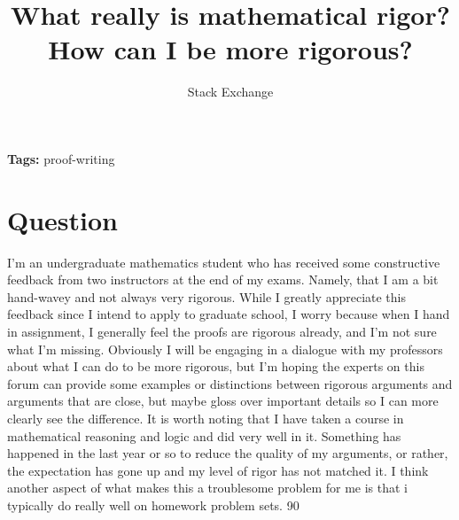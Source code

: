 \documentclass{article}
\title{What really is mathematical rigor? How can I be more rigorous?}
\author{Stack Exchange}
\date{}
\begin{document}
\maketitle

\noindent\textbf{Tags:} proof-writing

\section*{Question}
I'm an undergraduate mathematics student who has received some constructive feedback from two instructors at the end of my exams. Namely, that I am a bit hand-wavey and not always very rigorous. While I greatly appreciate this feedback since I intend to apply to graduate school, I worry because when I hand in assignment, I generally feel the proofs are rigorous already, and I'm not sure what I'm missing. Obviously I will be engaging in a dialogue with my professors about what I can do to be more rigorous, but I'm hoping the experts on this forum can provide some examples or distinctions between rigorous arguments and arguments that are close, but maybe gloss over important details so I can more clearly see the difference. It is worth noting that I have taken a course in mathematical reasoning and logic and did very well in it. Something has happened in the last year or so to reduce the quality of my arguments, or rather, the expectation has gone up and my level of rigor has not matched it. I think another aspect of what makes this a troublesome problem for me is that i typically do really well on homework problem sets. 90%
\end{document}
